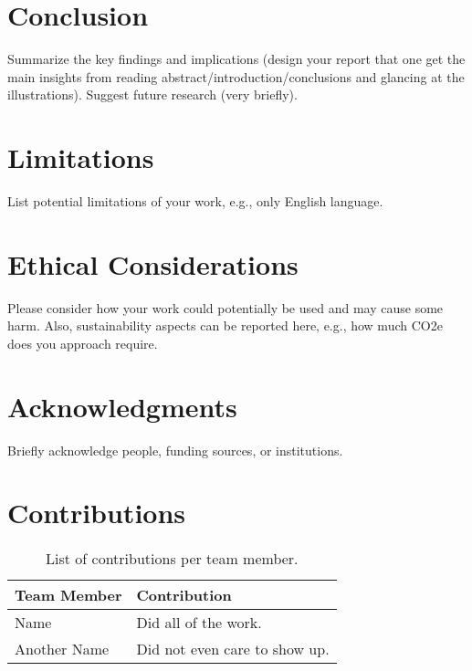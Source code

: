 \documentclass[12pt,a4paper,twocolumn]{article}
\begin{document}
\section{Conclusion}
\label{sec:conclusion}
Summarize the key findings and implications (design your report that one get the main insights from reading abstract/introduction/conclusions and glancing at the illustrations). 
Suggest future research (very briefly).


\newpage

\section*{Limitations}
List potential limitations of your work, e.g., only English language.

\section*{Ethical Considerations}
Please consider how your work could potentially be used and may cause some harm.
Also, sustainability aspects can be reported here, e.g., how much CO2e does you approach require.

\section*{Acknowledgments}
Briefly acknowledge people, funding sources, or institutions.

\section*{Contributions}
\begin{table}[h!]
    \centering
    \caption{List of contributions per team member.}
    \label{tab:contributions}
    \begin{tabular}{lp{4cm}}
        \toprule
        \textbf{Team Member} & \textbf{Contribution} \\
        \midrule
        Name            & Did all of the work.             \\
        Another Name    & Did not even care to show up.    \\
        \bottomrule
    \end{tabular}
\end{table}



\end{document}
